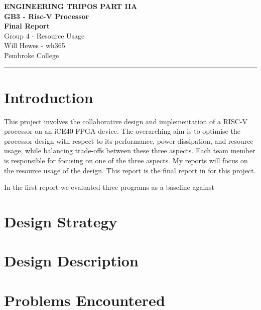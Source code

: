 \documentclass[a4paper,10pt]{article}
\renewcommand{\maketitle}{
    \begin{center}
        \LARGE \textbf{ENGINEERING TRIPOS PART IIA} \\ 
        \vspace{0.5em}
        \Large \textbf{GB3 - Risc-V Processor} \\ 
        \vspace{0.5em}
        \textbf{Final Report} \\
        \large Group 4 - Resource Usage \\
        \vspace{1em}
        \large Will Hewes - wh365 \\ 
        Pembroke College \\ 
        \vspace{0.5em}
    \end{center}
}
\begin{document}

\maketitle
\hrule
\tableofcontents
\newpage
{} \setcounter{page}{1}

\section{Introduction}
\label{sec:Introduction}

This project involves the collaborative design and implementation 
of a RISC-V processor on an iCE40 FPGA device. 
The overarching aim is to optimise 
the processor design with respect to its 
performance, power dissipation, and resource usage, 
while balancing trade-offs between these three aspects. 
Each team member is responsible for focusing on one of the three aspects.
My reports will focus on the resource usage of the design.
This report is the final report in for this project.

In the first report we evaluated three programs as a baseline against

\section{Design Strategy}
\label{sec:Design_Strategy}

\section{Design Description}
\label{sec:Design_Description}

\section{Problems Encountered}
\label{sec:Problems_Encountered}
\end{document}
